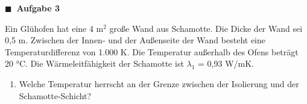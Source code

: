 \documentclass[aspectratio=169,9pt]{beamer}
\newcommand{\pp}{\par \vspace*{2mm}}
\newcommand{\antwort}[1]{
\begin{tcolorbox}[
	enhanced,
	colframe=unigrau!65,
	sharp corners,
	boxsep=1pt,
	colback=white,
	coltitle=black,
]
	#1
	\end{tcolorbox}
}
\begin{document}
\begin{frame}
\begin{minipage}{.5\textwidth}
{}
%
%
%
%
%
%
%
%

\end{minipage}%
\end{frame}


\begin{frame}

\begin{minipage}{.5\textwidth}
{\color{miugray}$\blacksquare ~$} \textbf{Aufgabe 3} \par \vspace*{2mm}
Ein Glühofen hat eine 4 m$^2$ große Wand aus Schamotte. Die Dicke der Wand sei 0,5 m.
Zwischen der Innen- und der Außenseite der Wand besteht eine Temperaturdifferenz von
1.000 K. Die Temperatur außerhalb des Ofens beträgt 20 °C. Die Wärmeleitfähigkeit der
Schamotte ist $\lambda_1$ = 0,93 W/mK. 

\pp
\begin{enumerate}[label=\alph*)]

\item[c)] Welche Temperatur herrscht an der Grenze zwischen der Isolierung und der
Schamotte-Schicht?
\end{enumerate}


\end{minipage}
\end{frame}
\end{document}
